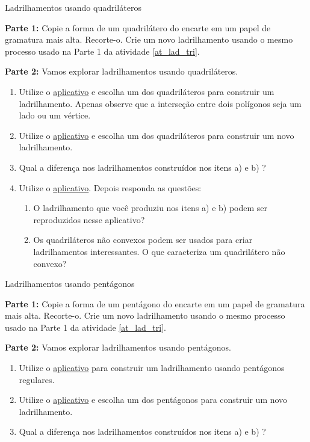 \begin{task}{Ladrilhamentos usando quadriláteros} \label{lad_qua}

\textbf{Parte 1:} Copie a forma de um quadrilátero do encarte em um papel de gramatura mais alta. Recorte-o. Crie um novo ladrilhamento usando o mesmo processo usado na Parte 1 da atividade \ref{at_lad_tri}. 

\textbf{Parte 2:} Vamos explorar  ladrilhamentos  usando quadriláteros. 
\begin{enumerate}

\item Utilize o \href{https://www.geogebra.org/m/d6nvffqk}{aplicativo} e escolha um dos quadriláteros para construir um ladrilhamento. Apenas observe que a interseção entre dois polígonos seja um lado ou um vértice.
\item Utilize o \href{https://www.geogebra.org/m/mdybnpnq}{aplicativo} e escolha um dos quadriláteros para construir um novo ladrilhamento.
\item Qual a diferença nos ladrilhamentos construídos nos itens a) e b) ?
\item Utilize o \href{https://www.geogebra.org/m/ejfw44rt}{aplicativo}. Depois responda as questões:
\begin{enumerate}
\item O ladrilhamento que você produziu nos itens a) e b) podem ser reproduzidos nesse aplicativo?
\item Os quadriláteros não convexos podem ser usados para criar ladrilhamentos interessantes. O que caracteriza um quadrilátero não convexo?
\end{enumerate}

\end{enumerate}

\end{task}


\begin{task}{Ladrilhamentos usando pentágonos}\label{lad_pen}

\textbf{Parte 1:} Copie a forma de  um pentágono do encarte em um papel de gramatura mais alta. Recorte-o. Crie um novo ladrilhamento usando o mesmo processo usado na Parte 1 da atividade \ref{at_lad_tri}. 

\textbf{Parte 2:} Vamos explorar  ladrilhamentos  usando pentágonos. 
\begin{enumerate}

\item Utilize o \href{https://www.geogebra.org/m/exzjd4mh}{aplicativo} para construir um ladrilhamento usando pentágonos regulares.
\item Utilize o  \href{https://www.geogebra.org/m/sffzzsww}{aplicativo}  e escolha um dos pentágonos para construir um novo ladrilhamento.
\item Qual a diferença nos ladrilhamentos construídos nos itens a) e b) ?
\end{enumerate}
\end{task}

